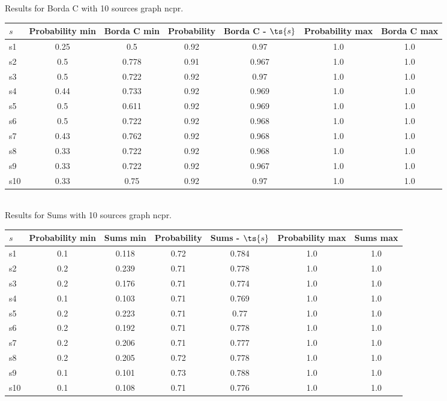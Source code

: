 \documentclass{article}
\begin{document}
\noindent Results for Borda C with 10 sources graph ncpr.

\noindent\begin{tabular}{|l|c|c|c|c|c|c|}
\hline
$s$& Probability min & Borda C min & Probability & Borda C - $\ts{s}$ & Probability max & Borda C max\\
\hline
s1 &0.25 & 0.5 & 0.92 & 0.97 & 1.0 & 1.0\\
\hline
s2 &0.5 & 0.778 & 0.91 & 0.967 & 1.0 & 1.0\\
\hline
s3 &0.5 & 0.722 & 0.92 & 0.97 & 1.0 & 1.0\\
\hline
s4 &0.44 & 0.733 & 0.92 & 0.969 & 1.0 & 1.0\\
\hline
s5 &0.5 & 0.611 & 0.92 & 0.969 & 1.0 & 1.0\\
\hline
s6 &0.5 & 0.722 & 0.92 & 0.968 & 1.0 & 1.0\\
\hline
s7 &0.43 & 0.762 & 0.92 & 0.968 & 1.0 & 1.0\\
\hline
s8 &0.33 & 0.722 & 0.92 & 0.968 & 1.0 & 1.0\\
\hline
s9 &0.33 & 0.722 & 0.92 & 0.967 & 1.0 & 1.0\\
\hline
s10 &0.33 & 0.75 & 0.92 & 0.97 & 1.0 & 1.0\\
\hline
\end{tabular}\\

\noindent Results for Sums with 10 sources graph ncpr.

\noindent\begin{tabular}{|l|c|c|c|c|c|c|}
\hline
$s$& Probability min & Sums min & Probability & Sums - $\ts{s}$ & Probability max & Sums max\\
\hline
s1 &0.1 & 0.118 & 0.72 & 0.784 & 1.0 & 1.0\\
\hline
s2 &0.2 & 0.239 & 0.71 & 0.778 & 1.0 & 1.0\\
\hline
s3 &0.2 & 0.176 & 0.71 & 0.774 & 1.0 & 1.0\\
\hline
s4 &0.1 & 0.103 & 0.71 & 0.769 & 1.0 & 1.0\\
\hline
s5 &0.2 & 0.223 & 0.71 & 0.77 & 1.0 & 1.0\\
\hline
s6 &0.2 & 0.192 & 0.71 & 0.778 & 1.0 & 1.0\\
\hline
s7 &0.2 & 0.206 & 0.71 & 0.777 & 1.0 & 1.0\\
\hline
s8 &0.2 & 0.205 & 0.72 & 0.778 & 1.0 & 1.0\\
\hline
s9 &0.1 & 0.101 & 0.73 & 0.788 & 1.0 & 1.0\\
\hline
s10 &0.1 & 0.108 & 0.71 & 0.776 & 1.0 & 1.0\\
\hline
\end{tabular}\\
\end{document}
